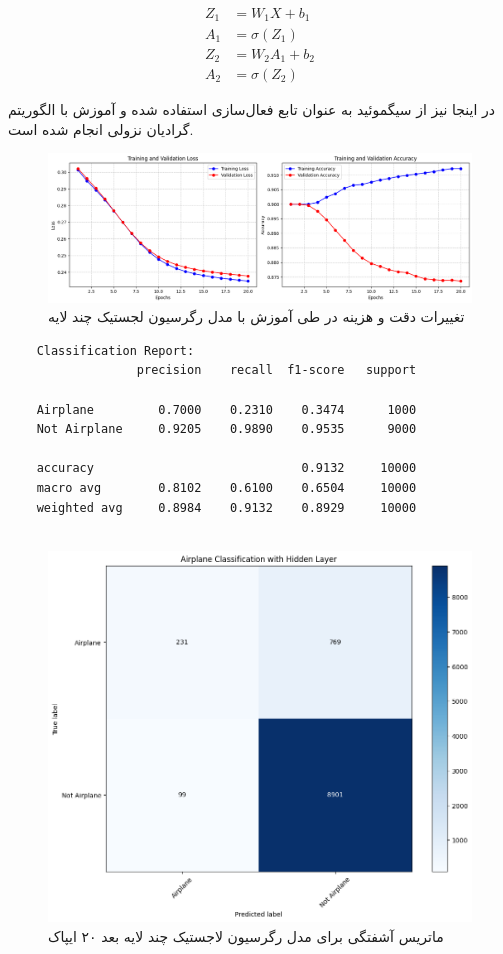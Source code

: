 	\[
	\begin{aligned}
		Z_1 &= W_1 X + b_1 \\
		A_1 &= \sigma(Z_1) \\
		Z_2 &= W_2 A_1 + b_2 \\
		A_2 &= \sigma(Z_2)
	\end{aligned}
	\]
	
	در اینجا نیز از سیگموئید به عنوان تابع فعال‌سازی استفاده شده و آموزش با الگوریتم گرادیان نزولی انجام شده است.
	
\begin{figure}[h]
	\centering
	\includegraphics[width=0.7\linewidth]{images/task2-1}
	\caption{تغییرات دقت و هزینه در طی آموزش با مدل رگرسیون لجستیک چند لایه}
	\label{fig:task2-1}
\end{figure}


\begin{lstlisting}
	Classification Report:
	              precision    recall  f1-score   support
	
	Airplane         0.7000    0.2310    0.3474      1000
	Not Airplane     0.9205    0.9890    0.9535      9000
	
	accuracy                             0.9132     10000
	macro avg        0.8102    0.6100    0.6504     10000
	weighted avg     0.8984    0.9132    0.8929     10000
	
\end{lstlisting}

\begin{figure}[h]
	\centering
	\includegraphics[width=0.5\linewidth]{images/task2-3}
	\caption{ماتریس آشفتگی برای مدل رگرسیون لاجستیک چند لایه بعد ۲۰ ایپاک}
	\label{fig:task1-3}
\end{figure}




